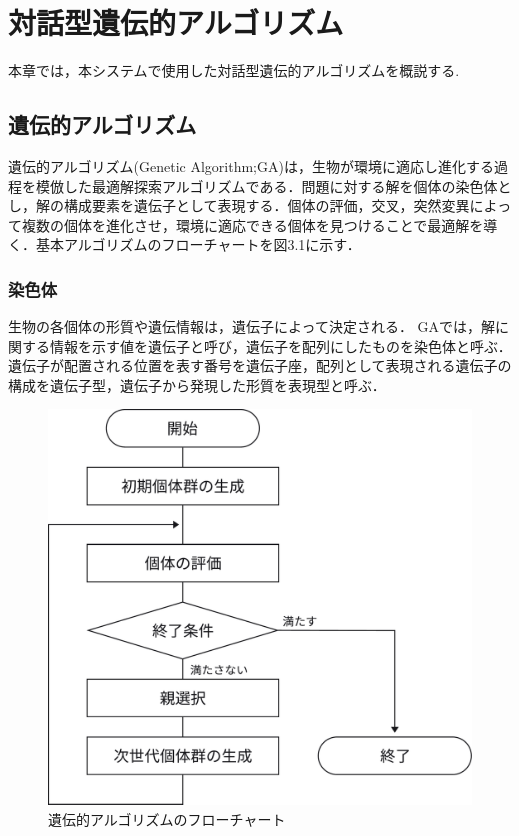 \chapter{対話型遺伝的アルゴリズム}
本章では，本システムで使用した対話型遺伝的アルゴリズムを概説する.
\section{遺伝的アルゴリズム}
遺伝的アルゴリズム(Genetic Algorithm;GA)は，生物が環境に適応し進化する過程を模倣した最適解探索アルゴリズムである．問題に対する解を個体の染色体とし，解の構成要素を遺伝子として表現する．個体の評価，交叉，突然変異によって複数の個体を進化させ，環境に適応できる個体を見つけることで最適解を導く．基本アルゴリズムのフローチャートを図3.1に示す．

\subsection{染色体}
生物の各個体の形質や遺伝情報は，遺伝子によって決定される．
GAでは，解に関する情報を示す値を遺伝子と呼び，遺伝子を配列にしたものを染色体と呼ぶ．
遺伝子が配置される位置を表す番号を遺伝子座，配列として表現される遺伝子の構成を遺伝子型，遺伝子から発現した形質を表現型と呼ぶ．

\begin{figure}[htbp]
	\begin{center}
		\includegraphics[scale=0.3]{image/flowchart.pdf}
		\caption{遺伝的アルゴリズムのフローチャート}
	\end{center}
\end{figure}

